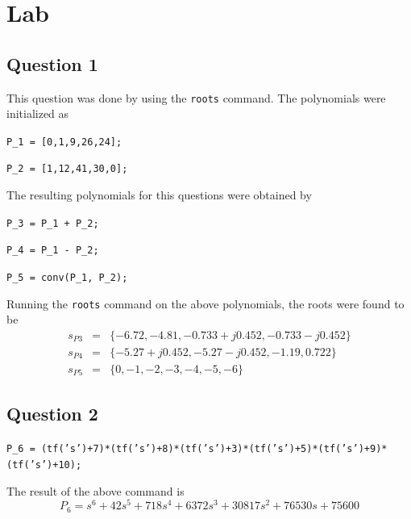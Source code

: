 \documentclass[12pt, a4paper]{article}
\begin{document}


	\section{Lab} %
	\label{sec:lab}
		\subsection*{Question 1} %
		\label{sub:question}
			This question was done by using the \texttt{roots} command. The polynomials were initialized as \par
			\texttt{P\_1 = [0,1,9,26,24];} \par
			\texttt{P\_2 = [1,12,41,30,0];}

			\noindent The resulting polynomials for this questions were obtained by \par
			\texttt{P\_3 = P\_1 + P\_2;} \par
			\texttt{P\_4 = P\_1 - P\_2;} \par
			\texttt{P\_5 = conv(P\_1, P\_2);} \par

			\noindent Running the \texttt{roots} command on the above polynomials, the roots were found to be
			\begin{equation*}
				\begin{array}{rcl}
					s_{P3} & = & \{-6.72,-4.81,-0.733 + j0.452, -0.733 - j0.452\} \\
					s_{P4} & = & \{-5.27 + j0.452,-5.27 - j0.452, -1.19, 0.722\} \\
					s_{P5} & = & \{0,-1,-2,-3,-4,-5,-6\}
				\end{array}
			\end{equation*}

		\subsection*{Question 2} %
		\label{sub:question_2}
			\texttt{P\_6 = (tf('s')+7)*(tf('s')+8)*(tf('s')+3)*(tf('s')+5)*(tf('s')+9)*(tf('s')+10);} \par\noindent
			The result of the above command is
			\[
				P_6 = s^6 + 42 s^5 + 718 s^4 + 6372 s^3 + 30817 s^2 + 76530 s + 75600
			\]

\end{document}
